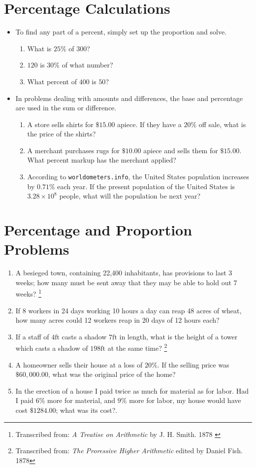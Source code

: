\documentclass{article}
\begin{document}
\section*{Percentage Calculations}
\begin{itemize}
    \item To find any part of a percent, simply set up the proportion and solve.
    \begin{enumerate}
    \item What is $25\%$ of $300$?
    \item $120$ is $30\%$ of what number?
    \item What percent of $400$ is $50$?
    \end{enumerate}
    \item In problems dealing with amounts and differences, the base and percentage are used in the sum or difference.
    \begin{enumerate}
        \item A store sells shirts for $\$15.00$ apiece. If they have a $20\%$ off sale, what is the price of the shirts?
        \item A merchant purchases rugs for $\$10.00$ apiece and sells them for $\$15.00$.  What percent markup has the merchant applied?
        \item According to {\tt worldometers.info}, the United States population increases by $0.71\%$ each year.  If the present population of the United States is $3.28 \times 10^{8}$ people, what will the population be next year?
    \end{enumerate}
\end{itemize}

\section*{Percentage and Proportion Problems}
\begin{enumerate}
  \item A besieged town, containing 22,400 inhabitants, has provisions to last 3 weeks; how many must be sent away that they may be able to hold out 7 weeks? \footnote{Transcribed from: {\em A Treatise on Arithmetic} by J. H. Smith. 1878 \label{fn:treatise}}
  \item  If 8 workers in 24 days working 10 hours a day can reap 48 acres of wheat, how many acres could 12 workers reap in 20 days of 12 hours each?
  \item If a staff of $4\mathrm{ft}$ casts a shadow $7\mathrm{ft}$ in length, what is the height of a tower which casts a shadow of $198\mathrm{ft}$ at the same time? \footnote{Transcribed from: {\em The Proressive Higher Arithmetic} edited by Daniel Fish. 1878\label{fn:higher}}
  \item A homeowner sells their house at a loss of $20\%$.  If the selling price was 
  $\$60,000.00$, what was the original price of the home?
  \item In the erection of a house I paid twice as much for material as for labor.  Had I paid $6\%$ more for material, and $9\%$ more for labor, my house would have cost $\$1284.00$; what was its cost?\footnotemark[\ref{fn:higher}].
\end{enumerate}
\end{document}
